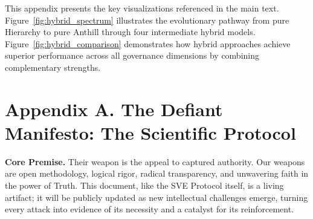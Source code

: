 \documentclass[11pt,a4paper]{article}
\begin{document}
This appendix presents the key visualizations referenced in the main text. Figure~\ref{fig:hybrid_spectrum} illustrates the evolutionary pathway from pure Hierarchy to pure Anthill through four intermediate hybrid models. Figure~\ref{fig:hybrid_comparison} demonstrates how hybrid approaches achieve superior performance across all governance dimensions by combining complementary strengths.


\clearpage %



\section*{Appendix A. The Defiant Manifesto: The Scientific Protocol}
\label{app:manifesto}

\vspace{1em}

\noindent{}

\vspace{1.5em}

\noindent\textbf{\textcolor{headercolor}{Core Premise.}} Their weapon is the appeal to captured authority. Our weapons are open methodology, logical rigor, radical transparency, and unwavering faith in the power of Truth. This document, like the SVE Protocol itself, is a living artifact; it will be publicly updated as new intellectual challenges emerge, turning every attack into evidence of its necessity and a catalyst for its reinforcement.

\vspace{1em}

\end{document}
